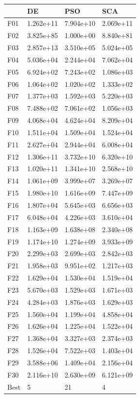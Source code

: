 \begin{tabular}{llll}
\toprule
{} &         DE &        PSO &        SCA \\
\midrule
F01  &  1.262e+11 &  7.904e+10 &  2.069e+11 \\
F02  &  3.825e+85 &  1.000e+00 &  8.840e+81 \\
F03  &  2.857e+13 &  3.510e+05 &  5.024e+05 \\
F04  &  5.036e+04 &  2.244e+04 &  7.062e+04 \\
F05  &  6.924e+02 &  7.243e+02 &  1.086e+03 \\
F06  &  1.064e+02 &  1.020e+02 &  1.333e+02 \\
F07  &  1.377e+03 &  1.592e+03 &  5.220e+03 \\
F08  &  7.488e+02 &  7.061e+02 &  1.056e+03 \\
F09  &  4.068e+04 &  4.624e+04 &  8.209e+04 \\
F10  &  1.511e+04 &  1.509e+04 &  1.524e+04 \\
F11  &  2.627e+04 &  2.944e+04 &  6.008e+04 \\
F12  &  1.306e+11 &  3.732e+10 &  6.320e+10 \\
F13  &  1.020e+11 &  1.341e+10 &  2.568e+10 \\
F14  &  1.061e+09 &  3.999e+07 &  3.269e+07 \\
F15  &  1.980e+10 &  1.616e+09 &  7.447e+09 \\
F16  &  1.807e+04 &  5.645e+03 &  6.656e+03 \\
F17  &  6.048e+04 &  4.226e+03 &  3.610e+04 \\
F18  &  1.163e+09 &  1.638e+08 &  2.340e+08 \\
F19  &  1.174e+10 &  1.274e+09 &  3.933e+09 \\
F20  &  2.299e+03 &  2.699e+03 &  2.842e+03 \\
F21  &  1.958e+03 &  9.951e+02 &  1.217e+03 \\
F22  &  1.629e+04 &  1.530e+04 &  1.519e+04 \\
F23  &  5.670e+03 &  1.529e+03 &  1.671e+03 \\
F24  &  4.284e+03 &  1.876e+03 &  1.629e+03 \\
F25  &  1.560e+04 &  1.199e+04 &  4.858e+04 \\
F26  &  1.626e+04 &  1.225e+04 &  1.522e+04 \\
F27  &  1.368e+04 &  3.327e+03 &  2.374e+03 \\
F28  &  1.526e+04 &  7.522e+03 &  1.403e+04 \\
F29  &  3.588e+06 &  1.409e+04 &  2.156e+04 \\
F30  &  2.116e+10 &  2.630e+09 &  6.121e+09 \\
Best &          5 &         21 &          4 \\
\bottomrule
\end{tabular}
